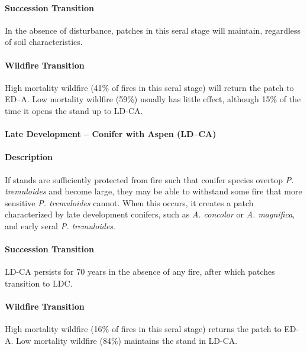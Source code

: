 \paragraph{Succession Transition} In the absence of disturbance, patches in this seral stage will maintain, regardless of soil characteristics.

\paragraph{Wildfire Transition} High mortality wildfire (41\% of fires in this seral stage) will return the patch to ED–A. Low mortality wildfire (59\%) usually has little effect, although 15\% of the time it opens the stand up to LD-CA.

\noindent\hrulefill


\paragraph{Late Development – Conifer with Aspen (LD–CA)}

\paragraph{Description} If stands are sufficiently protected from fire such that conifer species overtop \emph{P. tremuloides} and become large, they may be able to withstand some fire that more sensitive \emph{P. tremuloides} cannot. When this occurs, it creates a patch characterized by late development conifers, such as \emph{A. concolor} or \emph{A. magnifica}, and early seral \emph{P. tremuloides}. 

\paragraph{Succession Transition} LD-CA persists for 70 years in the absence of any fire, after which patches transition to LDC. 

\paragraph{Wildfire Transition} High mortality wildfire (16\% of fires in this seral stage) returns the patch to ED-A. Low mortality wildfire (84\%) maintains the stand in LD-CA. 

\noindent\hrulefill


\newpage

